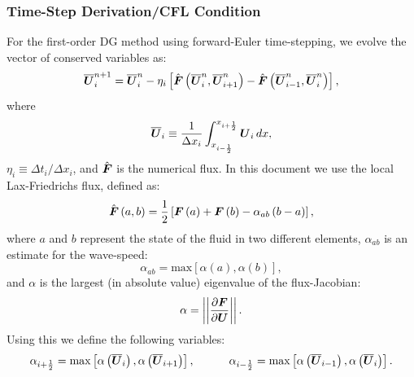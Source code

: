 \documentclass[10pt,preprint]{aastex}
\begin{document}
\subsubsection{Time-Step Derivation/CFL Condition}
For the first-order DG method using forward-Euler time-stepping, we evolve the vector of conserved variables as:
\begin{equation}\label{Eq:1stOrderDG}
    \overline{\boldsymbol{U}}^{n+1}_{i}=\overline{\boldsymbol{U}}^{n}_{i}-\eta_{i}\left[\hat{\boldsymbol{F}}\left(\overline{\boldsymbol{U}}^{n}_{i},\overline{\boldsymbol{U}}^{n}_{i+1}\right)-\hat{\boldsymbol{F}}\left(\overline{\boldsymbol{U}}^{n}_{i-1},\overline{\boldsymbol{U}}^{n}_{i}\right)\right],
\end{equation}
where
\begin{equation}
    \overline{\boldsymbol{U}}_{i}\equiv\frac{1}{\Delta x_{i}}\int_{x_{i-\frac{1}{2}}}^{x_{i+\frac{1}{2}}}\boldsymbol{U}_{i}\,dx,
\end{equation}
$\eta_{i}\equiv\Delta t_{i}/\Delta x_{i}$, and $\hat{\boldsymbol{F}}$ is the numerical flux. In this document we use the local Lax-Friedrichs flux, defined as:
\begin{equation}\label{Eq:LLF}
    \hat{\boldsymbol{F}}\left(a,b\right)=\frac{1}{2}\left[\boldsymbol{F}\left(a\right)+\boldsymbol{F}\left(b\right) - \alpha_{ab}\left(b-a\right)\right],
\end{equation}
where $a$ and $b$ represent the state of the fluid in two different elements, $\alpha_{ab}$ is an estimate for the wave-speed:
\begin{equation}
    \alpha_{ab}=\text{max}\left[\alpha\left(a\right),\alpha\left(b\right)\right],
\end{equation}
and $\alpha$ is the largest (in absolute value) eigenvalue of the flux-Jacobian:
\begin{equation}
    \alpha=\left|\left|\frac{\partial \boldsymbol{F}}{\partial \boldsymbol{U}}\right|\right|.
\end{equation}
Using this we define the following variables:
\begin{equation}\label{Eq:EigVals}
    \alpha_{i+\frac{1}{2}}=\text{max}\left[\alpha\left(\overline{\boldsymbol{U}}_{i}\right),\alpha\left(\overline{\boldsymbol{U}}_{i+1}\right)\right],\hspace{3em} \alpha_{i-\frac{1}{2}}=\text{max}\left[\alpha\left(\overline{\boldsymbol{U}}_{i-1}\right),\alpha\left(\overline{\boldsymbol{U}}_{i}\right)\right].
\end{equation}
\end{document}
